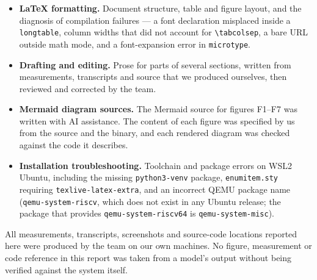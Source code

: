 \documentclass[11pt]{article}
\renewcommand{\_}{\origunderscore\allowbreak}
\begin{document}
\begin{itemize}[leftmargin=1.4cm, itemsep=4pt]

\item \textbf{\LaTeX{} formatting.} Document structure, table and figure layout, and the diagnosis of compilation failures --- a font declaration misplaced inside a \texttt{longtable}, column widths that did not account for \texttt{\textbackslash tabcolsep}, a bare URL outside math mode, and a font-expansion error in \texttt{microtype}.

\item \textbf{Drafting and editing.} Prose for parts of several sections, written from measurements, transcripts and source that we produced ourselves, then reviewed and corrected by the team.

\item \textbf{Mermaid diagram sources.} The Mermaid source for figures F1--F7 was written with AI assistance. The content of each figure was specified by us from the source and the binary, and each rendered diagram was checked against the code it describes.

\item \textbf{Installation troubleshooting.} Toolchain and package errors on WSL2 Ubuntu, including the missing \texttt{python3-venv} package, \texttt{enumitem.sty} requiring \texttt{texlive-latex-extra}, and an incorrect QEMU package name (\texttt{qemu-system-riscv}, which does not exist in any Ubuntu release; the package that provides \texttt{qemu-system-riscv64} is \texttt{qemu-system-misc}).

\end{itemize}

All measurements, transcripts, screenshots and source-code locations reported here were produced by the team on our own machines. No figure, measurement or code reference in this report was taken from a model's output without being verified against the system itself.
\end{document}
